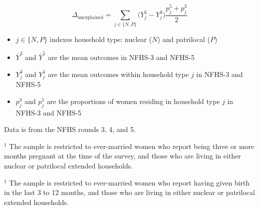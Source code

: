 \documentclass[12pt]{article}
\begin{document}
\begin{equation}
\Delta_{\text{unexplained}} =
\sum_{j \in \{N,P\}} \big(Y_j^{5} - Y_j^{3}\big)\frac{p_j^{5} + p_j^{3}}{2}
\end{equation}

\begin{itemize}
    \item $j \in \{N,P\}$ indexes household type: nuclear ($N$) and patrilocal ($P$)
    \item $\bar Y^{3}$ and $\bar Y^{5}$ are the mean outcomes in NFHS-3 and NFHS-5
    \item $Y_j^{3}$ and $Y_j^{5}$ are the mean outcomes within household type $j$ in NFHS-3 and NFHS-5
    \item $p_j^{3}$ and $p_j^{5}$ are the proportions of women residing in household type $j$ in NFHS-3 and NFHS-5
\end{itemize}




\begin{table}[H]
    \centering
    \begin{threeparttable}[t]
        \caption{:  None of the improvement in the outcomes is explained by changing composition in household structures}
        \label{tab:decomposition}

        \scriptsize
        \setlength{\tabcolsep}{10pt}
        \renewcommand{\arraystretch}{2.5}

        

        \begin{tablenotes}
            \item Data is from the NFHS rounds 3, 4, and 5. 
            \item $^1$ The sample is restricted to ever-married women who report being three or more months pregnant at the time of the survey, and those who are living in either nuclear or patrilocal extended households. 

            \item $^1$ The sample is restricted to ever-married women who report having given birth in the last 3 to 12 months, and those who are living in either nuclear or patrilocal extended households. 

            
        \end{tablenotes}
    \end{threeparttable}
\end{table}
\end{document}
